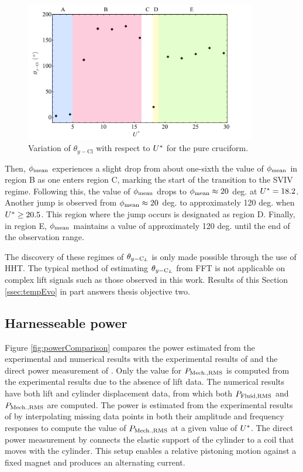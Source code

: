 \documentclass[oneside]{utmthesis}
\begin{document}
\begin{figure}[H]
  \centering
  \hspace{1cm} \includegraphics[width=0.9\textwidth]{figs/phaseAngleRegime}
  \caption{Variation of $\theta_{y-\text{Cl}}$ with respect to $U^{*}$ for the pure cruciform.}
  \label{fig:phaseAngleRegime}
\end{figure}

Then, $\phi_{\text{mean}}$ experiences a slight drop from about one-sixth the value of $\phi_{\text{mean}}$ in region B as one enters region C, marking the start of the transition to the SVIV regime. Following this, the value of $\phi_{\text{mean}}$ drops to $\phi_{\text{mean}} \approx 20$ deg. at $U^{*} = 18.2$. Another jump is observed from $\phi_{\text{mean}} \approx 20$ deg. to approximately 120 deg. when $U^{*} \geq 20.5$. This region where the jump occurs is designated as region D. Finally, in region E, $\phi_{\text{mean}}$ maintains a value of approximately 120 deg. until the end of the observation range.

The discovery of these regimes of $\theta_{y-\text{C}_{L}}$ is only made possible through the use of HHT. The typical method of estimating $\theta_{y-\text{C}_{L}}$ from FFT is not applicable on complex lift signals such as those observed in this work. Results of this Section \ref{ssec:tempEvo} in part answers thesis objective two.

\subsection{Harnesseable power} \label{ssec:mathModel}

Figure \ref{fig:powerComparison} compares the power estimated from the experimental and numerical results with the experimental results of \citet{Nguyen2012} and the direct power measurement of \citet{Koide2013}. Only the value for $P_{\text{Mech.,RMS}}$ is computed from the experimental results due to the absence of lift data. The numerical results have both lift and cylinder displacement data, from which both $P_{\text{Fluid,RMS}}$ and $P_{\text{Mech.,RMS}}$ are computed. The power is estimated from the experimental results of \citet{Nguyen2012} by interpolating missing data points in both their amplitude and frequency responses to compute the value of $P_{\text{Mech.,RMS}}$ at a given value of $U^{*}$. The direct power measurement by \citet{Koide2013} connects the elastic support of the cylinder to a coil that moves with the cylinder. This setup enables a relative pistoning motion against a fixed magnet and produces an alternating current.
\end{document}
